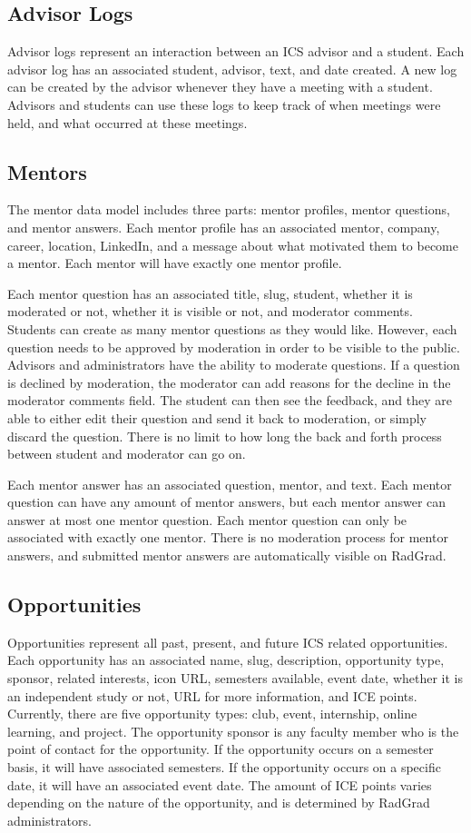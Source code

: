\subsection{Advisor Logs}
Advisor logs represent an interaction between an ICS advisor and a student. Each advisor log has an associated student, advisor, text, and date created. A new log can be created by the advisor whenever they have a meeting with a student. Advisors and students can use these logs to keep track of when meetings were held, and what occurred at these meetings. 

\subsection{Mentors}
The mentor data model includes three parts: mentor profiles, mentor questions, and mentor answers. Each mentor profile has an associated mentor, company, career, location, LinkedIn, and a message about what motivated them to become a mentor. Each mentor will have exactly one mentor profile.  

Each mentor question has an associated title, slug, student, whether it is moderated or not, whether it is visible or not, and moderator comments. Students can create as many mentor questions as they would like. However, each question needs to be approved by moderation in order to be visible to the public. Advisors and administrators have the ability to moderate questions. If a question is declined by moderation, the moderator can add reasons for the decline in the moderator comments field. The student can then see the feedback, and they are able to either edit their question and send it back to moderation, or simply discard the question. There is no limit to how long the back and forth process between student and moderator can go on. 

Each mentor answer has an associated question, mentor, and text. Each mentor question can have any amount of mentor answers, but each mentor answer can answer at most one mentor question. Each mentor question can only be associated with exactly one mentor. There is no moderation process for mentor answers, and submitted mentor answers are automatically visible on RadGrad. 

\subsection{Opportunities}
Opportunities represent all past, present, and future ICS related opportunities.  Each opportunity has an associated name, slug, description, opportunity type, sponsor, related interests, icon URL, semesters available, event date, whether it is an independent study or not, URL for more information, and ICE points. Currently, there are five opportunity types: club, event, internship, online learning, and project. The opportunity sponsor is any faculty member who is the point of contact for the opportunity. If the opportunity occurs on a semester basis, it will have associated semesters. If the opportunity occurs on a specific date, it will have an associated event date. The amount of ICE points varies depending on the nature of the opportunity, and is determined by RadGrad administrators. 

